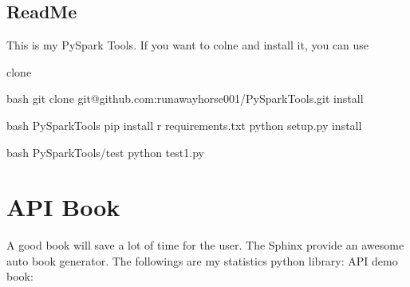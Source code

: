 \documentclass[letterpaper,12pt,english]{sphinxmanual}
\begin{document}
\section{ReadMe}
\label{\detokenize{pack:readme}}
\begin{sphinxVerbatim}[commandchars=\\\{\}]

This is my PySpark Tools. If you want to colne and install it, you can use

\PYGZhy{} clone

bash
git clone git@github.com:runawayhorse001/PySparkTools.git
\PYGZhy{} install

bash
 PySparkTools
pip install \PYGZhy{}r requirements.txt
python setup.py install

\PYGZhy{} 

bash
 PySparkTools/test
python test1.py
\end{sphinxVerbatim}


\chapter{API Book}
\label{\detokenize{api:api-book}}\label{\detokenize{api:api}}\label{\detokenize{api::doc}}
A good  book will save a lot of time for the user. The Sphinx provide an awesome auto  book generator. The followings are my statistics python library:  API demo book:


\section{}
\label{\detokenize{api:module-statspy.basics}}\label{\detokenize{api:rnorm}}
\end{document}
